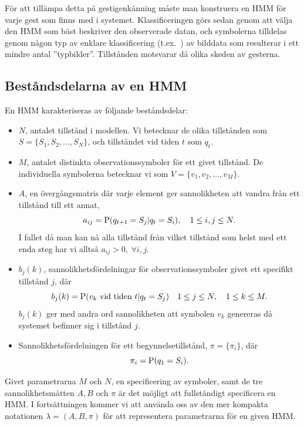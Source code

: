 \documentclass[../rapport_MVEX01-11-05]{subfiles}
\begin{document}
För att tillämpa detta på gestigenkänning måste man konstruera en HMM
för varje gest som finns med i systemet. Klassificeringen görs sedan genom
att välja den HMM som bäst beskriver den observerade datan, och symbolerna
tilldelas genom någon typ av enklare klassificering (t.ex.~\knn) av bilddata
som resulterar i ett mindre antal ''typbilder''. Tillstånden motsvarar
då olika skeden av gesterna.


\subsection{Beståndsdelarna av en HMM}
En HMM karakteriseras av följande beståndsdelar:
\begin{itemize}
\item $N$, antalet tillstånd i modellen. Vi betecknar de olika
  tillstånden som $S = \{S_1, S_2, \dots, S_N\}$, och tillståndet vid
  tiden $t$ som $q_t$.
\item $M$, antalet distinkta observationssymboler för ett givet
  tillstånd. De individuella symbolerna betecknar vi som $V =
  \{v_1,v_2,\dots,v_M\}$.
\item $A$, en övergångsmatris där varje element ger sannolikheten att
  vandra från ett tillstånd till ett annat, 
\begin{equation*}
a_{ij} = \mathrm{P}(q_{t+1} = S_j|q_t = S_i),\quad 1 \leq i,j \leq N.
\end{equation*}
I fallet då man kan nå alla tillstånd från vilket tillstånd som helst
med ett enda steg har vi alltså $a_{ij} > 0,\;\forall i,j$. 
\item $b_j(k)$, sannolikhetsfördelningar för observationssymboler givet ett
  specifikt tillstånd $j$, där 
\begin{equation*}
b_j(k) = \mathrm{P}(v_k \text{ vid tiden } t|q_t = S_j) \quad 1 \leq j \leq N,\quad1 \leq k \leq M.
\end{equation*}
$b_j(k)$ ger med andra ord sannolikheten att symbolen $v_k$ genereras
då systemet befinner sig i tillstånd $j$.
\item Sannolikhetsfördelningen för ett begynnelsetillstånd, $\pi =
  \{\pi_i\}$, där
\begin{equation*}
\pi_i = \mathrm{P}(q_1 = S_i).
\end{equation*}
\end{itemize}
Givet parametrarna $M$ och $N$, en specificering av symboler, samt de
tre sannolikhetsmåtten $A, B$ och $\pi$ är det möjligt att
fullständigt specificera en HMM. I fortsättningen kommer vi att
använda oss av den mer kompakta notationen $\lambda = (A,B,\pi)$
för att representera parametrarna för en given HMM.
\end{document}
